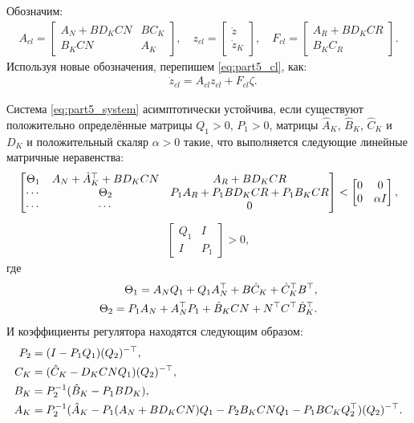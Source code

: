 Обозначим:
\begin{align}
	{A}_{cl} = \begin{bmatrix}
		{A}_N + {B}{D}_K{C}{N} & {B}{C}_K \\
		{B}_K{C}{N} & {A}_K
	\end{bmatrix},
	\quad
	{z}_{cl} = \begin{bmatrix}
		{\dot{z}} \\ {\dot{z}}_K 
	\end{bmatrix},
	\quad
	{F}_{cl} = \begin{bmatrix}
		{A}_R + {B}{D}_K{C}{R}\\ {B}_K{C}_R
	\end{bmatrix}.
\end{align}
Используя новые обозначения, перепишем \eqref{eq:part5_cl}, как:
\begin{align}
	\label{eq:part5_system}
	&{\dot{z}}_{cl} = {A}_{cl} {z}_{cl}+ {F}_{cl}\zeta.
\end{align}
\begin{theorem}
	Система \eqref{eq:part5_system} асимптотически устойчива, если существуют положительно определённые матрицы ${Q}_1>0$, ${P}_1>0$, матрицы $\hat{{A}}_K$,  $\hat{{B}}_K$, $\hat{{C}}_K$ и $D_K$
	и положительный скаляр $\alpha>0$ такие, что выполняется следующие линейные матричные неравенства:
		\begin{align}\label{eq:part5_finalLMI}
		\begin{bmatrix}
			{\Theta}_1  & {A}_N + {\hat{A}}_K^\top +{B}{D}_K{C}{N} & {A}_R + {B}{D}_K{C}{R}\\
			\cdots & {\Theta}_2 & {P}_{1}{A}_R + {P}_{1}{B}{D}_K{C}{R}+{P}_1{B}_K{C}{R}\\
			\cdots & \cdots & 0 
		\end{bmatrix} < 
		\begin{bmatrix}
			0 & 0\\
			0 & \alpha {I}
		\end{bmatrix},
	\end{align}
		\begin{align}\label{eq: condition}
		\begin{bmatrix} 
			{Q}_{1} & I \\ 
			I & {P}_{1}
		\end{bmatrix} > 0,
	\end{align}
	где
	\begin{align}
		{\Theta}_1 = {A}_N{Q}_{1} +{Q}_{1}{A}_N^\top + {B}{\hat{C}}_K +{\hat{C}}_K^\top{B}^\top, \\
		{\Theta}_2 = {P}_{1}{A}_N +{A}_N^\top{P}_{1}+{\hat{B}}_K{C}{N}+{N}^\top{C}^\top{\hat{B}}_K^\top.
	\end{align}
	И коэффициенты регулятора находятся следующим образом: 
	\begin{align}
		{P}_{2} &= ({I}-{P}_{1}{Q}_{1})({Q}_{2})^{-\top},\\
		{C}_K &= ({\hat{C}}_K - {D}_K {C} {N} {Q}_{1} ) ({Q}_{2})^{-\top},\\
		{B}_K &= {P}_{2}^{-1}({\hat{B}}_K- {P}_{1}{B}{D}_K),\\
		{A}_K &= {P}_{2}^{-1}({\hat{A}}_K-{P}_{1}({A}_N+{B}{D}_K{C}{N}){Q}_{1} - {P}_{2}{B}_K{C}{N}{Q}_{1}-{P}_{1} {B}{C}_K{Q}_{2}^\top)({Q}_{2})^{-\top}.
	\end{align}
\end{theorem}
